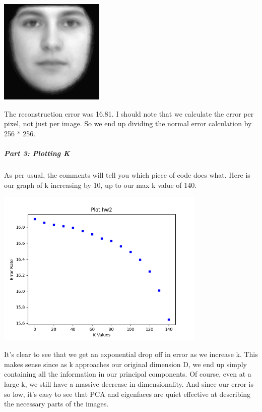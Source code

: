 \documentclass[12pt]{article}
\begin{document}
\begin{center}
    \includegraphics[width=5cm]{output_part2/reconstruct_4.png}
    \end{center}

    The reconstruction error was 16.81. I should note that we calculate the error
    per pixel, not just per image. So we end up dividing the normal error calculation by 256 * 256.

    \subparagraph{Part 3: Plotting K}
    As per usual, the comments will tell you which piece of code does what.
    Here is our graph of k increasing by 10, up to our max k value of 140.
    \begin{center}
    \includegraphics[width=10cm]{graph_part3.png}
    \end{center}
    It's clear to see that we get an exponential drop off in error as we increase k.
    This makes sense since as k approaches our original dimension D, we end up simply containing 
    all the information in our principal components. Of course, even at a large k, we still have a 
    massive decrease in dimensionality. And since our error is so low, it's easy to see that PCA and 
    eigenfaces are quiet effective at describing the necessary parts of the images.
\end{document}
